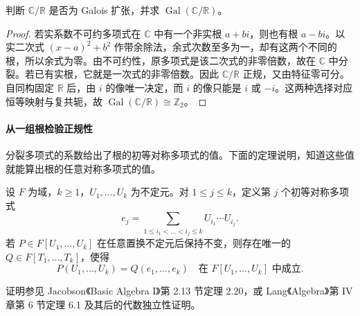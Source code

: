 \documentclass[lang=cn,a4paper,fontset=none,zihao=false,10pt,openany,twoside]{beautybook}
\numberwithin{algorithm}{chapter}
\begin{document}
\begin{example}[复数域上的自同构]\label{ex:complex-galois}
判断 $\mathbb C/\mathbb R$ 是否为 Galois 扩张，并求 $\operatorname{Gal}(\mathbb C/\mathbb R)$。
\end{example}
\begin{proof}
若实系数不可约多项式在 $\mathbb C$ 中有一个非实根 $a+bi$，则也有根 $a-bi$。以实二次式 $(x-a)^2+b^2$ 作带余除法，余式次数至多为一，却有这两个不同的根，所以余式为零。由不可约性，原多项式是该二次式的非零倍数，故在 $\mathbb C$ 中分裂。若已有实根，它就是一次式的非零倍数。因此 $\mathbb C/\mathbb R$ 正规，又由特征零可分。自同构固定 $\mathbb R$ 后，由 $i$ 的像唯一决定，而 $i$ 的像只能是 $i$ 或 $-i$。这两种选择对应恒等映射与复共轭，故 $\operatorname{Gal}(\mathbb C/\mathbb R)\cong\mathbb Z_2$。
\end{proof}

\paragraph{从一组根检验正规性}
分裂多项式的系数给出了根的初等对称多项式的值。下面的定理说明，知道这些值就能算出根的任意对称多项式的值。

\begin{theorem}[对称多项式基本定理]\label{thm:symmetric-polynomials}
设 $F$ 为域，$k\ge1$，$U_1,\dots,U_k$ 为不定元。对 $1\le j\le k$，定义第 $j$ 个初等对称多项式
\[
 e_j=\sum_{1\le i_1<\dots<i_j\le k} U_{i_1}\cdots U_{i_j}.
\]
若 $P\in F[U_1,\dots,U_k]$ 在任意置换不定元后保持不变，则存在唯一的 $Q\in F[T_1,\dots,T_k]$，使得
\[
 P(U_1,\dots,U_k)=Q(e_1,\dots,e_k)
 \quad\text{在 } F[U_1,\dots,U_k]\text{ 中成立}.
\]
\end{theorem}
证明参见 Jacobson《Basic Algebra I》第 2.13 节定理 2.20，或 Lang《Algebra》第 IV 章第 6 节定理 6.1 及其后的代数独立性证明。
\end{document}
